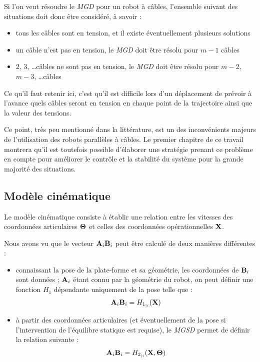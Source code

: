 Si l'on veut résoudre le {\it MGD} pour un robot à câbles, l'ensemble suivant 
des situations doit donc être considéré, à savoir :
\begin{itemize}
 \item tous les câbles sont en tension, et il existe éventuellement plusieurs 
solutions
 \item un câble n'est pas en tension, le {\it MGD} doit être résolu pour $m-1$ 
câbles
 \item 2, 3, \dots câbles ne sont pas en tension, le {\it MGD} doit être résolu 
pour $m-2$, $m-3$, \dots câbles
\end{itemize}

Ce qu'il faut retenir ici, c'est qu'il est difficile lors d'un déplacement de 
prévoir à l'avance quels câbles seront en tension en chaque point de la 
trajectoire ainsi que la valeur des tensions.

Ce point, très peu mentionné dans la littérature, est un des inconvénients 
majeurs de l'utilisation des robots parallèles à câbles. Le premier chapitre de 
ce travail montrera qu'il est toutefois possible d'élaborer une stratégie 
prenant ce problème en compte pour améliorer le contrôle et la stabilité du 
système pour la grande majorité des situations.

\subsection{Modèle cinématique}\label{chap0-1-5}

Le modèle cinématique consiste à établir une relation entre les vitesses des 
coordonnées articulaires ${\bf \Theta}$ et celles des coordonnées 
opérationnelles ${\bf X}$.

Nous avons vu que le vecteur ${\bf A}_i{\bf B}_i$ peut être calculé de deux 
manières différentes :
\begin{itemize}
 \item connaissant la pose de la plate-forme et sa géométrie, les coordonnées de 
${\bf B}_i$ sont données ; ${\bf A}_i$ étant connu par la géométrie du robot, on 
peut définir une fonction $H_1$ dépendante uniquement de la pose telle que :
\begin{equation}
{\bf A}_i{\bf B}_i = H_{1_{|i}}({\bf X})
\label{intro:eq6}
\end{equation}
 \item à partir des coordonnées articulaires (et éventuellement de la pose si 
l'intervention de l'équilibre statique est requise), le {\it MGSD} permet de 
définir la relation suivante :
\begin{equation}
{\bf A}_i{\bf B}_i = H_{2_{|i}}({\bf X}, {\bf \Theta})
\label{intro:eq7}
\end{equation}
\end{itemize}
 
